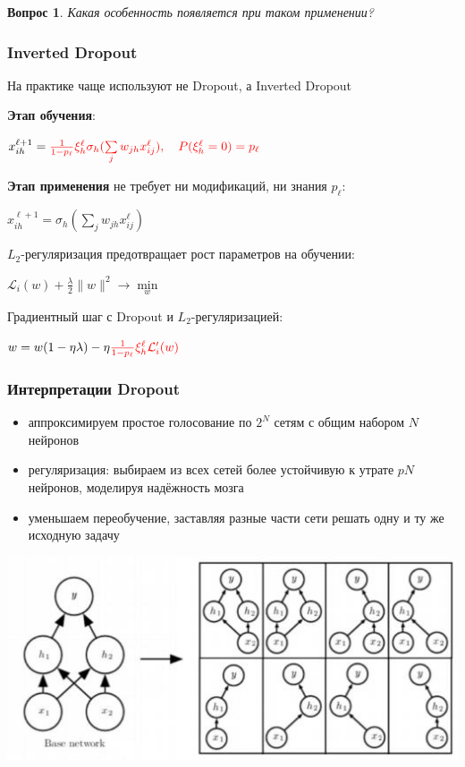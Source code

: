 \documentclass[fullscreen=true, bookmarks=true, hyperref={pdfencoding=unicode}]{beamer}
\newtheorem*{question}{Вопрос}
\begin{document}
\begin{frame}
    \begin{question}
    Какая особенность появляется при таком применении?
    \end{question}
\end{frame}


\begin{frame}
  \frametitle{Inverted Dropout}

  На практике чаще используют не Dropout, а Inverted Dropout

  {\bf Этап обучения}:

  $x_{ih}^{\ell + 1} = \color{red}{\frac{1}{1-p_\ell} \xi_h^\ell} \sigma_h (\sum\limits_j w_{jh} x_{ij}^\ell), \ \ \
   P(\xi_h^\ell = 0) = p_\ell$

  {\bf Этап применения} не требует ни модификаций, ни знания $p_\ell$:

  $x_{ih}^{\ell + 1} = \sigma_h(\sum\limits_j w_{jh} x_{ij}^\ell)$

  $L_2$-регуляризация предотвращает рост параметров на обучении:

  $\mathcal{L}_i(w) + \frac{\lambda}{2} \|w\|^2 \to \min\limits_w$

  Градиентный шаг с Dropout и $L_2$-регуляризацией:

  $w = w (1 - \eta \lambda) - \eta\color{red}{\frac{1}{1-p_\ell} \xi_h^\ell} \mathcal{L}_i^\prime(w)$
\end{frame}


\begin{frame}
  \frametitle{Интерпретации Dropout}

  \begin{itemize}
    \item аппроксимируем простое голосование по $2^N$ сетям с общим набором $N$ нейронов
    \item регуляризация: выбираем из всех сетей более устойчивую к утрате $pN$ нейронов, моделируя надёжность мозга
    \item уменьшаем переобучение, заставляя разные части сети решать одну и ту же исходную задачу
  \end{itemize}

  \begin{center}
    \includegraphics[keepaspectratio,
                     width=0.6\paperwidth]{dropout_interpretation.jpg}
  \end{center}
\end{frame}
\end{document}
